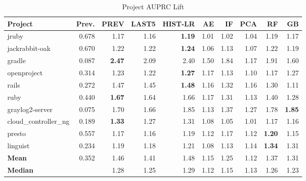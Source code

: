 \begin{table}[htbp]
\centering
\small
\caption{Project AUPRC Lift}
\label{tab:lift}
\begin{tabular}{lrrrrrrrrr}
\toprule
Project & Prev. & PREV & LAST5 & HIST-LR & AE & IF & PCA & RF & GB \\
\midrule
jruby & 0.678 & 1.17 & 1.16 & \textbf{1.19} & 1.01 & 1.02 & 1.04 & 1.19 & 1.17 \\
jackrabbit-oak & 0.670 & 1.22 & 1.22 & \textbf{1.24} & 1.06 & 1.13 & 1.07 & 1.22 & 1.19 \\
gradle & 0.087 & \textbf{2.47} & 2.09 & 2.40 & 1.50 & 1.84 & 1.17 & 1.91 & 1.60 \\
openproject & 0.314 & 1.23 & 1.22 & \textbf{1.27} & 1.17 & 1.13 & 1.10 & 1.17 & 1.27 \\
rails & 0.272 & 1.47 & 1.45 & \textbf{1.48} & 1.16 & 1.32 & 1.16 & 1.30 & 1.11 \\
ruby & 0.440 & \textbf{1.67} & 1.64 & 1.66 & 1.17 & 1.31 & 1.13 & 1.40 & 1.28 \\
graylog2-server & 0.075 & 1.70 & 1.66 & 1.85 & 1.13 & 1.37 & 1.27 & 1.78 & \textbf{1.85} \\
cloud\_controller\_ng & 0.189 & \textbf{1.33} & 1.27 & 1.31 & 1.08 & 1.05 & 1.01 & 1.17 & 1.16 \\
presto & 0.557 & 1.17 & 1.16 & 1.19 & 1.12 & 1.17 & 1.12 & \textbf{1.20} & 1.15 \\
linguist & 0.234 & 1.19 & 1.18 & 1.21 & 1.08 & 1.13 & 1.14 & \textbf{1.34} & 1.31 \\
\midrule
\textbf{Mean} & 0.352 & 1.46 & 1.41 & 1.48 & 1.15 & 1.25 & 1.12 & 1.37 & 1.31 \\
\textbf{Median} & & 1.28 & 1.25 & 1.29 & 1.12 & 1.15 & 1.13 & 1.26 & 1.23 \\
\bottomrule
\end{tabular}
\end{table}
